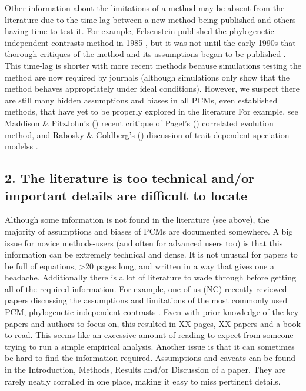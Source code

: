 \documentclass[a4paper,12pt]{article}
\begin{document}
    Other information about the limitations of a method may be absent from the literature due to the time-lag between a new method being published and others having time to test it. 
    For example, Felsenstein published the phylogenetic independent contrasts method in 1985 \citep{felsenstein1985phylogenies}, but it was not until the early 1990s that thorough critiques of the method and its assumptions began to be published \citep[e.g.][]{garland1992procedures}.
    This time-lag is shorter with more recent methods because simulations testing the method are now required by journals (although simulations only show that the method behaves appropriately under ideal conditions).
    However, we suspect there are still many hidden assumptions and biases in all PCMs, even established methods, that have yet to be properly explored in the literature
    For example, see Maddison \& FitzJohn's (\citeyear{maddison2014unsolved}) recent critique of Pagel's (\citeyear{pagel1994detecting}) correlated evolution method, and Rabosky \& Goldberg's (\citeyear{rabosky2015model}) discussion of trait-dependent speciation modelss \citep{maddison2007estimating,nee1994reconstructed}.

  \subsection{2. The literature is too technical and/or important details are difficult to locate}
    Although some information is not found in the literature (see above), the majority of assumptions and biases of PCMs are documented somewhere. 
    A big issue for novice methods-users (and often for advanced users too) is that this information can be extremely technical and dense.
    It is not unusual for papers to be full of equations, \textgreater 20 pages long, and written in a way that gives one a headache. 
    Additionally there is a lot of literature to wade through before getting all of the required information. 
    For example, one of us (NC) recently reviewed papers discussing the assumptions and limitations of the most commonly used PCM, phylogenetic independent contrasts \citep{felsenstein1985phylogenies}. 
    Even with prior knowledge of the key papers and authors to focus on, this resulted in XX pages, XX papers and a book to read. %
    This seems like an excessive amount of reading to expect from someone trying to run a simple empirical analysis.
    Another issue is that it can sometimes be hard to find the information required. 
    Assumptions and caveats can be found in the Introduction, Methods, Results and/or Discussion of a paper. 
    They are rarely neatly corralled in one place, making it easy to miss pertinent details. 
\end{document}
